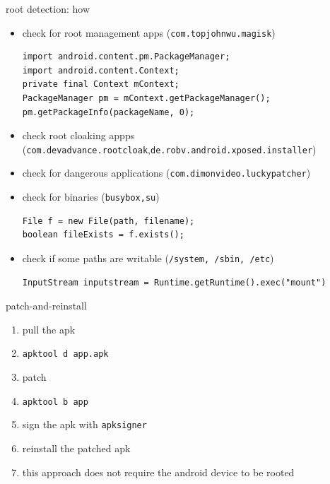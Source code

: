 \documentclass{beamer}
\begin{document}


\begin{frame}[fragile]{root detection: how}

    \begin{itemize}[<+->]
        \item check for root management apps (\texttt{com.topjohnwu.magisk})
\begin{verbatim}
import android.content.pm.PackageManager;
import android.content.Context;
private final Context mContext;
PackageManager pm = mContext.getPackageManager();
pm.getPackageInfo(packageName, 0);
\end{verbatim}
        \item check root cloaking appps {\small (\texttt{com.devadvance.rootcloak},\texttt{de.robv.android.xposed.installer})}
        \item check for dangerous applications (\texttt{com.dimonvideo.luckypatcher})
        \item check for binaries (\texttt{busybox,su})
\begin{verbatim}
File f = new File(path, filename);
boolean fileExists = f.exists();
\end{verbatim}
        \item check if some paths are writable (\texttt{/system, /sbin, /etc})
\begin{verbatim}
InputStream inputstream = Runtime.getRuntime().exec("mount")
\end{verbatim}
    \end{itemize}

\end{frame}

\begin{frame}{patch-and-reinstall}

    \begin{enumerate}[<+->]
        \item pull the apk
        \item {\footnotesize \texttt{apktool d app.apk}}
        \item patch
        \item {\footnotesize \texttt{apktool b app}}
        \item sign the apk with {\footnotesize \texttt{apksigner}}
        \item reinstall the patched apk
        \item this approach does not require the android device to be rooted 
    \end{enumerate}

\end{frame}
\end{document}
